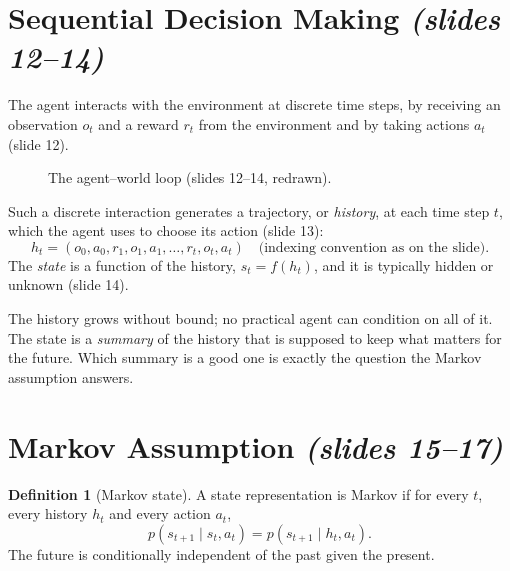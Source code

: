 \documentclass[11pt,a4paper]{article}
\newcommand{\slr}[1]{\texorpdfstring{\emph{(slides #1)}}{(slides #1)}}
\theoremstyle{plain}
\theoremstyle{definition}
\newtheorem{definition}[theorem]{Definition}
\theoremstyle{remark}
\begin{document}
\section{Sequential Decision Making \slr{12--14}}
The agent interacts with the environment at discrete time steps, by receiving an observation $o_t$ and a reward $r_t$ from the environment and by taking actions $a_t$ (slide 12).

\begin{figure}[htbp]
\centering
{}
\caption{The agent--world loop (slides 12--14, redrawn).}
\end{figure}

Such a discrete interaction generates a trajectory, or \emph{history}, at each time step $t$, which the agent uses to choose its action (slide 13):
\[
  h_t=(o_0,a_0,r_1,o_1,a_1,\dots,r_t,o_t,a_t)\quad\text{(indexing convention as on the slide)}.
\]
The \emph{state} is a function of the history, $s_t=f(h_t)$, and it is typically hidden or unknown (slide 14).

\begin{intuition}
The history grows without bound; no practical agent can condition on all of it. The state is a \emph{summary} of the history that is supposed to keep what matters for the future. Which summary is a good one is exactly the question the Markov assumption answers.
\end{intuition}

\section{Markov Assumption \slr{15--17}}
\begin{definition}[Markov state]\label{def:markov}
A state representation is Markov if for every $t$, every history $h_t$ and every action $a_t$,
\[
  p(s_{t+1}\mid s_t,a_t)=p(s_{t+1}\mid h_t,a_t).
\]
The future is conditionally independent of the past given the present.
\end{definition}
\end{document}
